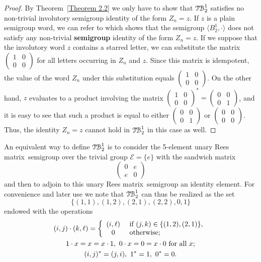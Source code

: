 \documentclass[11pt,reqno]{amsart}
\numberwithin{equation}{section}
\theoremstyle{remark}
\def\Rm{Rees matrix}
\def\TB{\ensuremath{\mathcal{T\kern-1pt B}_2^1}}
\begin{document}
\begin{proof}
By Theorem~\ref{Theorem 2.2} we only have to show that $\TB$
satisfies no non-trivial involutory semigroup identity of the form
$Z_n=z$. If $z$ is a plain semigroup word, we can refer to
\cite[Lemma~3.7]{sapirburnside} which shows that the semigroup
$\langle B_2^1,\cdot\rangle$ does not satisfy any non-trivial
\textbf{semigroup} identity of the form $Z_n=z$. If we suppose
that the involutory word $z$ contains a starred letter, we can
substitute the matrix $\left(\begin{smallmatrix}1 & 0\\ 0 &
0\end{smallmatrix}\right)$ for all letters occurring in $Z_n$ and
$z$. Since this matrix is idempotent, the value of the word $Z_n$
under this substitution equals $\left(\begin{smallmatrix}1 & 0\\ 0
& 0\end{smallmatrix}\right)$. On the other hand, $z$ evaluates to
a product involving the matrix $\left(\begin{smallmatrix}1 & 0\\ 0
& 0\end{smallmatrix}\right)^*= \left(\begin{smallmatrix}0 & 0\\ 0
& 1\end{smallmatrix}\right)$, and it is easy to see that such a
product is equal to either $\left(\begin{smallmatrix}0 & 0\\ 0 &
1\end{smallmatrix}\right)$ or $\left(\begin{smallmatrix}0 & 0\\ 0
& 0\end{smallmatrix}\right)$. Thus, the identity $Z_n=z$ cannot
hold in $\TB$ in this case as well.
\end{proof}

An equivalent way to define $\TB$ is to consider the 5-element
unary \Rm\ semigroup over the trivial group $\mathcal{E}=\{e\}$
with the sandwich matrix
$$\begin{pmatrix}
0 & e\\
e & 0
\end{pmatrix}$$
and then to adjoin to this unary \Rm\ semigroup an identity
element. For convenience and later use we note that $\TB$ can thus
be realized as the set
$$\{(1,1),(1,2),(2,1),(2,2),0,1\}$$ endowed with the operations
\begin{gather}
\label{operations in TB}
(i,j)\cdot(k,\ell)=\left\{\begin{array}{cl}
(i,\ell)&\ \text{if}\ (j,k)\in \{(1,2),(2,1)\},\\
0 &\ \text{otherwise};
\end{array}\right.\\
1\cdot x=x=x\cdot 1,\ 0\cdot x=0=x\cdot 0 \text{ for all }x; \notag\\
 (i,j)^* = (j,i),\ 1^*=1,\ 0^*=0\notag.
\end{gather}
\end{document}
